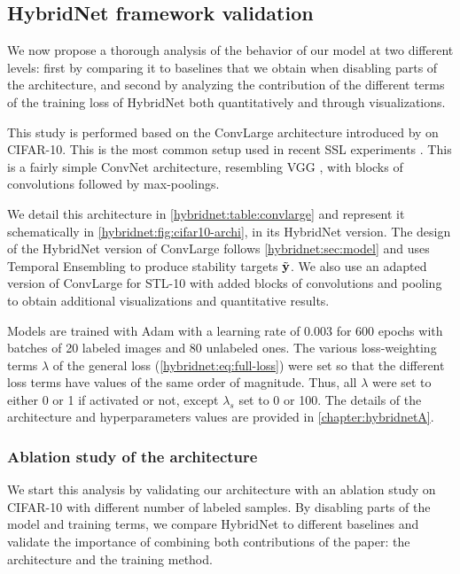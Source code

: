\subsection{HybridNet framework validation}
\label{hybridnet:sec:as}

We now propose a thorough analysis of the behavior of our model at two different levels: first by comparing it to baselines that we obtain when disabling parts of the architecture, and second by analyzing the contribution of the different terms of the training loss of HybridNet both quantitatively and through visualizations.

This study is performed based on the ConvLarge architecture introduced by \citet{Rasmus2015} on CIFAR-10. This is the most common setup used in recent \ac{SSL} experiments \citep{Sajjadi2016,Laine2016,Tarvainen2017}. This is a fairly simple \ac{ConvNet} architecture, resembling VGG \citep{simonyan2015very}, with blocks of convolutions followed by max-poolings.

We detail this architecture in \autoref{hybridnet:table:convlarge} and represent it schematically in \autoref{hybridnet:fig:cifar10-archi}, in its HybridNet version. The design of the HybridNet version of ConvLarge follows \autoref{hybridnet:sec:model} and uses Temporal Ensembling \citep{Laine2016} to produce stability targets $\tilde{\mathbf{y}}$. We also use an adapted version of ConvLarge for STL-10 with added blocks of convolutions and pooling to obtain additional visualizations and quantitative results.

Models are trained with Adam with a learning rate of 0.003 for 600 epochs with batches of 20 labeled images and 80 unlabeled ones. The various loss-weighting terms $\lambda$ of the general loss (\autoref{hybridnet:eq:full-loss}) were set so that the different loss terms have values of the same order of magnitude. Thus, all $\lambda$ were set to either 0 or 1 if activated or not, except $\lambda_s$ set to 0 or 100. The details of the architecture and hyperparameters values are provided in \autoref{chapter:hybridnetA}.


\subsubsection{Ablation study of the architecture}

We start this analysis by validating our architecture with an ablation study on CIFAR-10 with different number of labeled samples. By disabling parts of the model and training terms, we compare HybridNet to different baselines and validate the importance of combining both contributions of the paper: the architecture and the training method.

